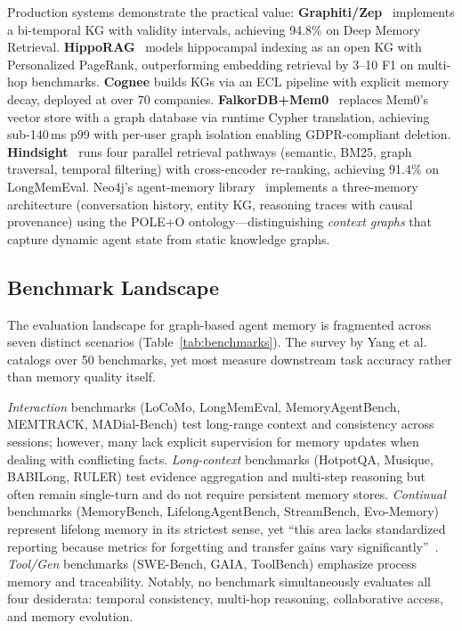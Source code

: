 \documentclass[hf]{ceurart}
\begin{document}
Production systems demonstrate the practical value:
\textbf{Graphiti/Zep}~\cite{rasmussen2025} implements a bi-temporal KG
with validity intervals, achieving 94.8\% on Deep Memory Retrieval.
\textbf{HippoRAG}~\cite{hipporag2024} models hippocampal indexing as
an open KG with Personalized PageRank, outperforming embedding retrieval
by 3--10 F1 on multi-hop benchmarks.
\textbf{Cognee} builds KGs via an ECL pipeline with explicit memory
decay, deployed at over 70 companies.
\textbf{FalkorDB+Mem0}~\cite{falkordb2025} replaces Mem0's vector store
with a graph database via runtime Cypher translation, achieving
sub-140\,ms p99 with per-user graph isolation enabling GDPR-compliant
deletion.
\textbf{Hindsight}~\cite{hindsight2025} runs four parallel retrieval
pathways (semantic, BM25, graph traversal, temporal filtering) with
cross-encoder re-ranking, achieving 91.4\% on LongMemEval.
Neo4j's agent-memory library~\cite{neo4jagentmem2026} implements a
three-memory architecture (conversation history, entity KG, reasoning
traces with causal provenance) using the POLE+O ontology---distinguishing
\emph{context graphs} that capture dynamic agent state from static
knowledge graphs.


\subsection{Benchmark Landscape}
\label{sec:benchmarks}

The evaluation landscape for graph-based agent memory is fragmented
across seven distinct scenarios (Table~\ref{tab:benchmarks}). The
survey by Yang et al.~\cite{graphmemsurvey2026} catalogs over 50
benchmarks, yet most measure downstream task accuracy rather than
memory quality itself.

\emph{Interaction} benchmarks (LoCoMo, LongMemEval, MemoryAgentBench,
MEMTRACK, MADial-Bench) test long-range context and consistency across
sessions; however, many lack explicit supervision for memory updates
when dealing with conflicting facts.
\emph{Long-context} benchmarks (HotpotQA, Musique, BABILong, RULER)
test evidence aggregation and multi-step reasoning but often remain
single-turn and do not require persistent memory stores.
\emph{Continual} benchmarks (MemoryBench, LifelongAgentBench,
StreamBench, Evo-Memory) represent lifelong memory in its strictest
sense, yet ``this area lacks standardized reporting because metrics
for forgetting and transfer gains vary
significantly''~\cite{graphmemsurvey2026}.
\emph{Tool/Gen} benchmarks (SWE-Bench, GAIA, ToolBench) emphasize
process memory and traceability.
Notably, no benchmark simultaneously evaluates all four desiderata:
temporal consistency, multi-hop reasoning, collaborative access, and
memory evolution.
\end{document}
